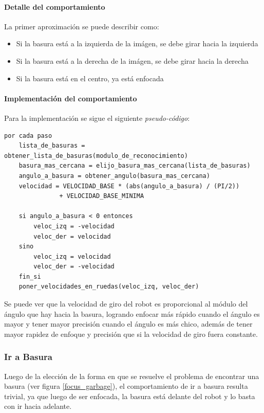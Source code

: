 \paragraph{Detalle del comportamiento}
La primer aproximaci\'on se puede describir como:
\begin{itemize}
\item Si la basura est\'a a la izquierda de la im\'agen, se debe girar hacia la
			izquierda
\item Si la basura est\'a a la derecha de la im\'agen, se debe girar hacia la
			derecha
\item Si la basura est\'a en el centro, ya est\'a enfocada
\end{itemize}

\paragraph{Implementaci\'on del comportamiento}
\label{focus_garbage:impl}
Para la implementaci\'on se sigue el siguiente \emph{pseudo-c\'odigo}:
\begin{verbatim}
por cada paso
    lista_de_basuras = obtener_lista_de_basuras(modulo_de_reconocimiento)
    basura_mas_cercana = elijo_basura_mas_cercana(lista_de_basuras)
    angulo_a_basura = obtener_angulo(basura_mas_cercana)
    velocidad = VELOCIDAD_BASE * (abs(angulo_a_basura) / (PI/2))
               + VELOCIDAD_BASE_MINIMA

    si angulo_a_basura < 0 entonces
        veloc_izq = -velocidad
        veloc_der = velocidad
    sino
        veloc_izq = velocidad
        veloc_der = -velocidad
    fin_si
    poner_velocidades_en_ruedas(veloc_izq, veloc_der)
\end{verbatim}

Se puede ver que la velocidad de giro del robot es proporcional al m\'odulo del
\'angulo que hay hacia la basura, logrando enfocar m\'as r\'apido cuando el
\'angulo es mayor y tener mayor precisi\'on cuando el \'angulo es m\'as chico,
adem\'as de tener mayor rapidez de enfoque y precisi\'on que si la velocidad de
giro fuera constante.
\\\indent

\subsubsection{Ir a Basura}
\label{go_to_garbage}
Luego de la elecci\'on de la forma en que se resuelve el problema de encontrar
una basura (ver figura \ref{focus_garbage}), el comportamiento de ir a basura
resulta trivial, ya que luego de ser enfocada, la basura est\'a delante del
robot y lo basta con ir hacia adelante.

